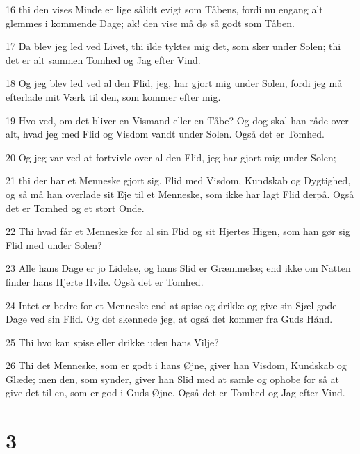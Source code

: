 \par 16 thi den vises Minde er lige sålidt evigt som Tåbens, fordi nu engang alt glemmes i kommende Dage; ak! den vise må dø så godt som Tåben.
\par 17 Da blev jeg led ved Livet, thi ilde tyktes mig det, som sker under Solen; thi det er alt sammen Tomhed og Jag efter Vind.
\par 18 Og jeg blev led ved al den Flid, jeg, har gjort mig under Solen, fordi jeg må efterlade mit Værk til den, som kommer efter mig.
\par 19 Hvo ved, om det bliver en Vismand eller en Tåbe? Og dog skal han råde over alt, hvad jeg med Flid og Visdom vandt under Solen. Også det er Tomhed.
\par 20 Og jeg var ved at fortvivle over al den Flid, jeg har gjort mig under Solen;
\par 21 thi der har et Menneske gjort sig. Flid med Visdom, Kundskab og Dygtighed, og så må han overlade sit Eje til et Menneske, som ikke har lagt Flid derpå. Også det er Tomhed og et stort Onde.
\par 22 Thi hvad får et Menneske for al sin Flid og sit Hjertes Higen, som han gør sig Flid med under Solen?
\par 23 Alle hans Dage er jo Lidelse, og hans Slid er Græmmelse; end ikke om Natten finder hans Hjerte Hvile. Også det er Tomhed.
\par 24 Intet er bedre for et Menneske end at spise og drikke og give sin Sjæl gode Dage ved sin Flid. Og det skønnede jeg, at også det kommer fra Guds Hånd.
\par 25 Thi hvo kan spise eller drikke uden hans Vilje?
\par 26 Thi det Menneske, som er godt i hans Øjne, giver han Visdom, Kundskab og Glæde; men den, som synder, giver han Slid med at samle og ophobe for så at give det til en, som er god i Guds Øjne. Også det er Tomhed og Jag efter Vind.

\chapter{3}

